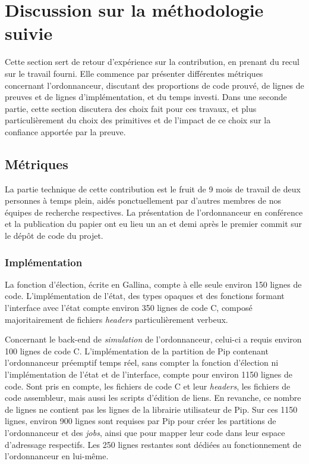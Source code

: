 	\section{Discussion sur la méthodologie suivie}

		Cette section sert de retour d'expérience sur la contribution, en prenant du recul sur le travail fourni.
		Elle commence par présenter différentes métriques concernant l'ordonnanceur, discutant des proportions de code prouvé, de lignes de preuves et de lignes d'implémentation, et du temps investi. Dans une seconde partie, cette section discutera des choix fait pour ces travaux, et plus particulièrement du choix des primitives et de l'impact de ce choix sur la confiance apportée par la preuve.

		\subsection{Métriques}

		La partie technique de cette contribution est le fruit de 9 mois de travail de deux personnes à temps plein, aidés ponctuellement par d'autres membres de nos équipes de recherche respectives. La présentation de l'ordonnanceur en conférence et la publication du papier ont eu lieu un an et demi après le premier commit sur le dépôt de code du projet.

			\subsubsection{Implémentation}
			La fonction d'élection, écrite en Gallina, compte à elle seule environ 150 lignes de code. L'implémentation de l'état, des types opaques et des fonctions formant l'interface avec l'état compte environ 350 lignes de code C, composé majoritairement de fichiers \emph{headers} particulièrement verbeux.

			Concernant le back-end de \emph{simulation} de l'ordonnanceur, celui-ci a requis environ 100 lignes de code C. L'implémentation de la partition de Pip contenant l'ordonnanceur préemptif temps réel, sans compter la fonction d'élection ni l'implémentation de l'état et de l'interface, compte pour environ 1150 lignes de code. Sont pris en compte, les fichiers de code C et leur \emph{headers}, les fichiers de code assembleur, mais aussi les scripts d'édition de liens. En revanche, ce nombre de lignes ne contient pas les lignes de la librairie utilisateur de Pip. Sur ces 1150 lignes, environ 900 lignes sont requises par Pip pour créer les partitions de l'ordonnanceur et des \emph{jobs}, ainsi que pour mapper leur code dans leur espace d'adressage respectifs. Les 250 lignes restantes sont dédiées au fonctionnement de l'ordonnanceur en lui-même.

